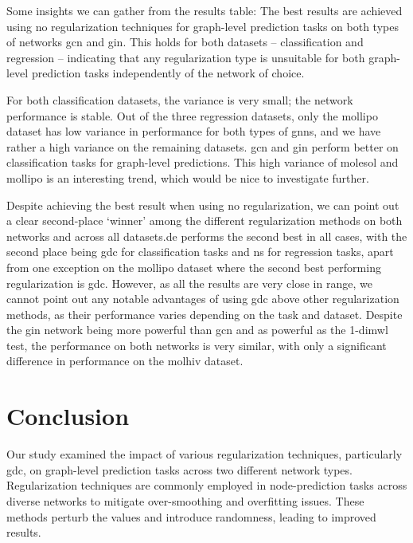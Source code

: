 Some insights we can gather from the results table:
The best results are achieved using no regularization techniques for graph-level prediction tasks on both types of networks \ac{gcn} and \ac{gin}. This holds for both datasets -- classification and regression -- indicating that any regularization type is unsuitable for both graph-level prediction tasks independently of the network of choice.

For both classification datasets, the variance is very small; the network performance is stable. Out of the three regression datasets, only the mollipo dataset has low variance in performance for both types of \acp{gnn}, and we have rather a high variance on the remaining datasets. \ac{gcn} and \ac{gin} perform better on classification tasks for graph-level predictions. This high variance of molesol and mollipo is an interesting trend, which would be nice to investigate further.

Despite achieving the best result when using no regularization, we can point out a clear second-place `winner' among the different regularization methods on both networks and across all datasets.\ac{de} performs the second best in all cases, with the second place being \ac{gdc} for classification tasks and \ac{ns} for regression tasks, apart from one exception on the mollipo dataset where the second best performing regularization is \ac{gdc}. However, as all the results are very close in range, we cannot point out any notable advantages of using \ac{gdc} above other regularization methods, as their performance varies depending on the task and dataset.
Despite the \ac{gin} network being more powerful than \ac{gcn} and as powerful as the 1-dim\ac{wl} test, the performance on both networks is very similar, with only a significant difference in performance on the molhiv dataset.

\section{Conclusion}

Our study examined the impact of various regularization techniques, particularly \ac{gdc}, on graph-level prediction tasks across two different network types. Regularization techniques are commonly employed in node-prediction tasks across diverse networks to mitigate over-smoothing and overfitting issues. These methods perturb the values and introduce randomness, leading to improved results.

